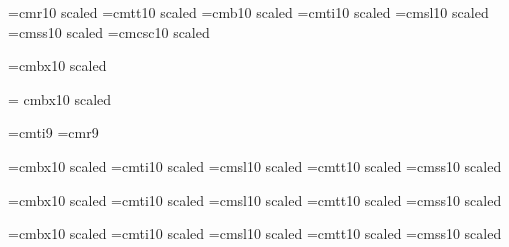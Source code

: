 \begin{\parsearg\beginxxx}
\def\node{\parsearg\nodezzz}
\def\nodezzz#1{\nodexxx [#1,]}
\def\nodexxx[#1,#2]{\gdef\lastnode{#1}}
\let\lastnode=\relax

\def\donoderef{\ifx\lastnode\relax\else
\expandafter\expandafter\expandafter\setref{\lastnode}\fi
\let\lastnode=\relax}

\def\unnumbnoderef{\ifx\lastnode\relax\else
\expandafter\expandafter\expandafter\unnumbsetref{\lastnode}\fi
\let\lastnode=\relax}

\let\refill=\relax

\let\setfilename=\comment

\def\inforef #1{\inforefzzz #1,,,,**}
\def\inforefzzz #1,#2,#3,#4**{See Info file \file{\losespace#3{}}, node `\losespace#1{}'}
\def\losespace #1{#1}



\font\tenrm=cmr10 scaled \magstephalf
\font\tentt=cmtt10 scaled \magstephalf
\font\tenbf=cmb10 scaled \magstephalf
\font\tenit=cmti10 scaled \magstephalf
\font\tensl=cmsl10 scaled \magstephalf
\font\tensf=cmss10 scaled \magstephalf
\def\li{\sf}
\font\tensc=cmcsc10 scaled \magstephalf

\font{}=cmbx10 scaled  %
\let\deftt=\tentt
\def\df{\let\tt=\deftt \defbf}

\font\titlerm = cmbx10 scaled 

\font\indit=cmti9 \font\indrm=cmr9
\def\indbf{\indrm} \def\indsl{\indit}
\def\indexfonts{\let\it=\indit \let\sl=\indsl \let\bf=\indbf \let\rm=\indrm}

\font\chaprm=cmbx10 scaled 
\font\chapit=cmti10 scaled 
\font\chapsl=cmsl10 scaled 
\font\chaptt=cmtt10 scaled 
\font\chapsf=cmss10 scaled 
\let\chapbf=\chaprm

\font\secrm=cmbx10 scaled 
\font\secit=cmti10 scaled 
\font\secsl=cmsl10 scaled 
\font\sectt=cmtt10 scaled 
\font\secsf=cmss10 scaled 
\let\secbf=\secrm

\font\ssecrm=cmbx10 scaled 
\font\ssecit=cmti10 scaled 
\font\ssecsl=cmsl10 scaled 
\font\ssectt=cmtt10 scaled 
\font\ssecsf=cmss10 scaled 
\let\ssecbf=\ssecrm


\end{\parsearg\beginxxx}
